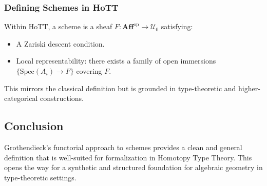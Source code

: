 \documentclass{article}
\begin{document}
\subsubsection*{Defining Schemes in HoTT}

Within HoTT, a scheme is a sheaf $F : \mathbf{Aff}^{\mathrm{op}} \to \mathcal{U}_0$ satisfying:

\begin{itemize}
  \item A Zariski descent condition.
  \item Local representability: there exists a family of open immersions $\{ \mathrm{Spec}(A_i) \to F \}$ covering $F$.
\end{itemize}

This mirrors the classical definition but is grounded in type-theoretic and higher-categorical constructions.

\subsection{Conclusion}

Grothendieck’s functorial approach to schemes provides a clean and general definition that is well-suited for formalization in Homotopy Type Theory. This opens the way for a synthetic and structured foundation for algebraic geometry in type-theoretic settings.
\end{document}
